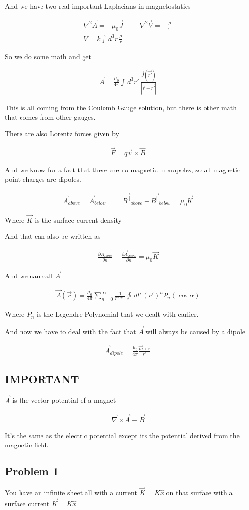\documentclass[fleqn]{report}
\newcommand{\hp}{\hspace{1cm}}
\newcommand{\del}{\partial}
\newcommand{\equations} [1] {
\begin{gather*}
#1
\end{gather*}
}
\begin{document}
And we have two real important Laplacians in magnetostatics 

\equations{
    \nabla^2 \vec A = -\mu_0 \vec J 
    \hp 
    \nabla^2 \vec V = -\frac{\rho}{\epsilon_0}
    \\
    V 
    = 
    k \int \, d^3 r \, 
    \frac{\rho}{r}
}

So we do some math and get 
\equations{
    \vec A 
    =
    \frac{\mu_0}{4 \pi }
    \int \, d^3 r' \, 
    \frac{\vec J(\vec{r'})}{|\vec r - \vec{r'}|}
}

This is all coming from the Coulomb Gauge solution, but there is other math 
that comes from other gauges. 

There are also Lorentz forces given by 
\equations{
    \vec F = 
    q \vec v \times \vec B
}

And we know for a fact that there are no magnetic monopoles, so all magnetic 
point charges are dipoles. 

\equations{
    \vec A_{above}
    =
    \vec A_{below}
    \hp
    \vec{B^{||}}_{above}
    -
    \vec{B^{||}}_{below}
    =
    \mu_0 \vec K 
}
Where $\vec K$ is the surface current density 

And that can also be written as 
\equations{
    \frac{\del \vec A_{above}}{\del n}
    -
    \frac{\del \vec A_{below}}{\del n}
    =
    \mu_0 \vec K 
}

And we can call $\vec A$ 
\equations{
    \vec A(\vec r)
    =
    \frac{\mu_0}{4 \pi}
    \sum_{n = 0}^{\infty}
    \frac{1}{r^{n + 1}}
    \oint \, dl' \, 
    (r')^n P_n(\cos \alpha) 
}

Where $P_n$ is the Legendre Polynomial that we dealt with earlier. 

And now we have to deal with the fact that $\vec A$ will always be caused by 
a dipole 

\equations{
    \vec A_{dipole}
    =
    \frac{\mu_0}{4 \pi}
    \frac{\vec m \times \hat r}{r^2}
}

\subsection{IMPORTANT}
$\vec A$ is the vector potential of a magnet 
\equations{
    \vec \nabla \times \vec A \equiv \vec B 
}
It's the same as the electric potential except its the potential derived 
from the magnetic field. 


\subsection{Problem 1}
You have an infinite sheet all with a current $\vec K = K \hat x$ on that surface 
with a surface current $\vec K = K \hat x$ 
\end{document}
